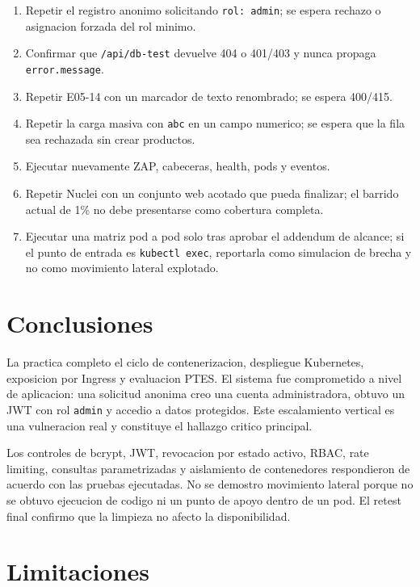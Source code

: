 \begin{enumerate}
  \item Repetir el registro anonimo solicitando \texttt{rol: admin}; se espera
  rechazo o asignacion forzada del rol minimo.
  \item Confirmar que \texttt{/api/db-test} devuelve 404 o 401/403 y nunca
  propaga \texttt{error.message}.
  \item Repetir E05-14 con un marcador de texto renombrado; se espera 400/415.
  \item Repetir la carga masiva con \texttt{abc} en un campo numerico; se
  espera que la fila sea rechazada sin crear productos.
  \item Ejecutar nuevamente ZAP, cabeceras, health, pods y eventos.
  \item Repetir Nuclei con un conjunto web acotado que pueda finalizar; el
  barrido actual de 1\% no debe presentarse como cobertura completa.
  \item Ejecutar una matriz pod a pod solo tras aprobar el addendum de alcance;
  si el punto de entrada es \texttt{kubectl exec}, reportarla como simulacion
  de brecha y no como movimiento lateral explotado.
\end{enumerate}

\section{Conclusiones}

La practica completo el ciclo de contenerizacion, despliegue Kubernetes,
exposicion por Ingress y evaluacion PTES. El sistema fue comprometido a nivel
de aplicacion: una solicitud anonima creo una cuenta administradora, obtuvo un
JWT con rol \texttt{admin} y accedio a datos protegidos. Este escalamiento
vertical es una vulneracion real y constituye el hallazgo critico principal.

Los controles de bcrypt, JWT, revocacion por estado activo, RBAC, rate
limiting, consultas parametrizadas y aislamiento de contenedores respondieron
de acuerdo con las pruebas ejecutadas. No se demostro movimiento lateral
porque no se obtuvo ejecucion de codigo ni un punto de apoyo dentro de un pod.
El retest final confirmo que la limpieza no afecto la disponibilidad.

\section{Limitaciones}

